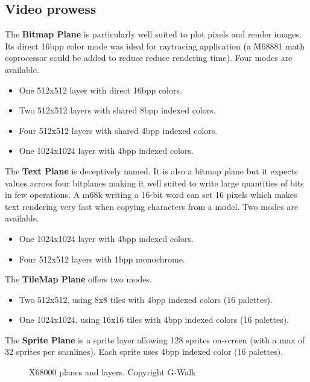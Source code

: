 \subsection{Video prowess}

The \textbf{Bitmap Plane} is particularly well suited to plot pixels and render images. Its direct 16bpp color mode was ideal for raytracing application (a M68881 math coprocessor could be added to reduce reduce rendering time). Four modes are available.


\begin{itemize}[topsep=0pt]
\item One 512x512 layer with direct 16bpp colors.
\item Two 512x512 layers with shared 8bpp indexed colors.
\item Four 512x512 layers with shared 4bpp indexed colors.
\item One 1024x1024 layer with 4bpp indexed colors.
\end{itemize}

The \textbf{Text Plane} is deceptively named. It is also a bitmap plane but it expects values across four bitplanes making it well suited to write large quantities of bits in few operations. A m68k writing a 16-bit word can set 16 pixels which makes text rendering very fast when copying characters from a model. Two modes are available.

\begin{itemize}[topsep=0pt]
\item One 1024x1024 layer with 4bpp indexed colors.
\item Four 512x512 layers with 1bpp monochrome.
\end{itemize}


The \textbf{TileMap Plane} offers two modes.
\begin{itemize}[topsep=0pt]
\item Two 512x512, using 8x8 tiles with 4bpp indexed colors (16 palettes).
\item One 1024x1024, using 16x16 tiles with 4bpp indexed colors (16 palettes).
\end{itemize}

The \textbf{Sprite Plane} is a sprite layer allowing 128 sprites on-screen (with a max of 32 sprites per scanlines). Each sprite uses 4bpp indexed color (16 palettes).


 \begin{figure}[H]
\caption*{X68000 planes and layers. Copyright G-Walk\cite{x68k_perfect_catalogue}}
\end{figure}



